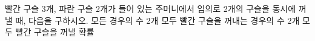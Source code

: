 빨간 구슬 3개, 파란 구슬 2개가 들어 있는 주머니에서 임의로 2개의 구슬을 동시에 꺼낼 때, 다음을 구하시오.
 모든 경우의 수
 2개 모두 빨간 구슬을 꺼내는 경우의 수
 2개 모두 빨간 구슬을 꺼낼 확률
